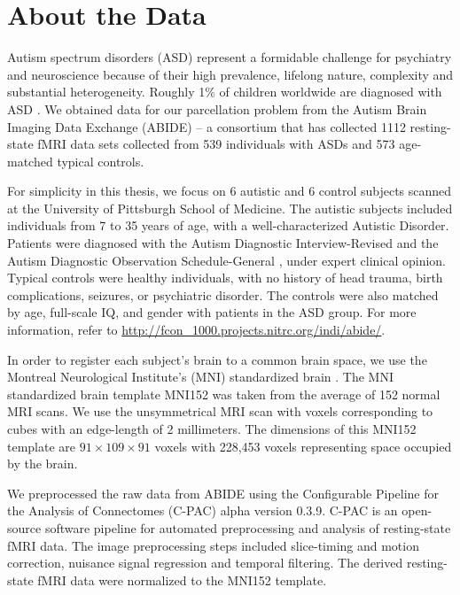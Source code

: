 \section{About the Data}

Autism spectrum disorders (ASD) represent a formidable challenge for
psychiatry and neuroscience because of their high prevalence, lifelong
nature, complexity and substantial heterogeneity. Roughly 1\% of
children worldwide are diagnosed with ASD \cite{centers2010autism}.
We obtained data for our parcellation problem from the Autism Brain
Imaging Data Exchange (ABIDE) -- a consortium that has collected
1112 resting-state fMRI data sets collected from 539 individuals
with ASDs and 573 age-matched typical controls.

For simplicity in this thesis, we focus on 6 autistic and 6 control
subjects scanned at the University of Pittsburgh School of Medicine.
The autistic subjects included individuals from 7 to 35 years of age,
with a well-characterized Autistic Disorder. Patients were diagnosed
with the Autism Diagnostic Interview-Revised \cite{lord1994autism} and
the Autism Diagnostic Observation Schedule-General \cite{lord2000autism},
under expert clinical opinion. Typical controls were healthy
individuals, with no history of head trauma, birth complications,
seizures, or psychiatric disorder. The controls were also matched by
age, full-scale IQ, and gender with patients in the ASD group.
For more information, refer to
\url{http://fcon_1000.projects.nitrc.org/indi/abide/}.

In order to register each subject's brain to a common brain space, we
use the Montreal Neurological Institute's (MNI) standardized brain
\cite{evans19933d, collins1994automatic}.
The MNI standardized brain template MNI152 was taken from the average
of 152 normal MRI scans. We use the unsymmetrical MRI scan with voxels
corresponding to cubes with an edge-length of 2 millimeters. The
dimensions of this MNI152 template are $91 \times 109 \times 91$ voxels
with 228,453 voxels representing space occupied by the brain.

We preprocessed the raw data from ABIDE using the Configurable Pipeline
for the Analysis of Connectomes (C-PAC) alpha version 0.3.9. C-PAC is
an open-source software pipeline for automated preprocessing and
analysis of resting-state fMRI data. The image preprocessing steps
included slice-timing and motion correction, nuisance signal regression
and temporal filtering. The derived resting-state fMRI data were
normalized to the MNI152 template.

